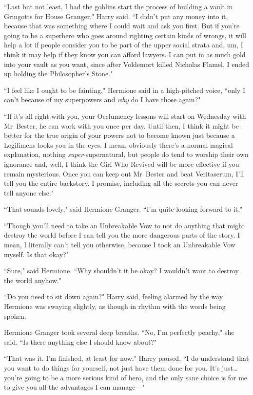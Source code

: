 ``Last but not least, I had the goblins start the process of building a vault in Gringotts for House Granger," Harry said. ``I didn't put any money into it, because that was something where I could wait and ask you first. But if you're going to be a superhero who goes around righting certain kinds of wrongs, it will help a lot if people consider you to be part of the upper social strata and, um, I think it may help if they know you can afford lawyers. I can put in as much gold into your vault as you want, since after Voldemort killed Nicholas Flamel, I ended up holding the Philosopher's Stone."

``I feel like I ought to be fainting," Hermione said in a high-pitched voice, ``only I can't because of my superpowers and \emph{why} do I have those again?"

``If it's all right with you, your Occlumency lessons will start on Wednesday with Mr~Bester, he can work with you once per day. Until then, I think it might be better for the true origin of your powers not to become known just because a Legilimens looks you in the eyes. I mean, obviously there's a normal magical explanation, nothing \emph{super}-supernatural, but people do tend to worship their own ignorance and, well, I think the Girl-Who-Revived will be more effective if you remain mysterious. Once you can keep out Mr~Bester and beat Veritaserum, I'll tell you the entire backstory, I promise, including all the secrets you can never tell anyone else."

``That sounds lovely," said Hermione Granger. ``I'm quite looking forward to it."

``Though you'll need to take an Unbreakable Vow to not do anything that might destroy the world before I can tell you the more dangerous parts of the story. I mean, I literally can't tell you otherwise, because I took an Unbreakable Vow myself. Is that okay?"

``Sure," said Hermione. ``Why shouldn't it be okay? I wouldn't want to destroy the world anyhow."

``Do you need to sit down again?" Harry said, feeling alarmed by the way Hermione was swaying slightly, as though in rhythm with the words being spoken.

Hermione Granger took several deep breaths. ``No, I'm perfectly peachy," she said. ``Is there anything else I should know about?"

``That was it. I'm finished, at least for now." Harry paused. ``I do understand that you want to do things for yourself, not just have them done for you. It's just{\ldots} you're going to be a more serious kind of hero, and the only sane choice is for me to give you all the advantages I can manage—"

